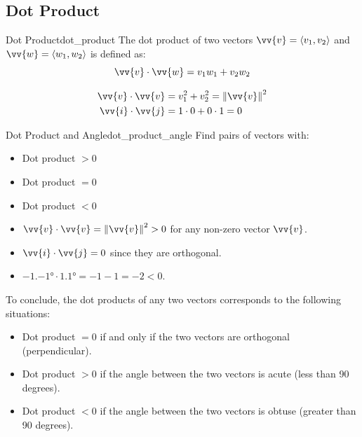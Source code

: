 \subsection{Dot Product}
\begin{definition}{Dot Product}{dot_product}
The dot product of two vectors $\vv{v} = \ang{v_1, v_2}$ and $\vv{w} = \ang{w_1, w_2}$ is defined as:
\[
\vv{v} \cdot \vv{w} = v_1 w_1 + v_2 w_2
\]
\end{definition}

\begin{example}
\begin{align*}
\vv{v} \cdot \vv{v} &= v_1^2 + v_2^2 = \norm{\vv{v}}^2\\
\vv{i} \cdot \vv{j} &= 1 \cdot 0 + 0 \cdot 1 = 0
\end{align*}
\end{example}

\begin{problem}{Dot Product and Angle}{dot_product_angle}
Find pairs of vectors with:
\begin{itemize}
    \item Dot product $> 0$
    \item Dot product $= 0$
    \item Dot product $< 0$
\end{itemize}
\end{problem}

\begin{sol}
\begin{itemize}
    \item $\vv{v} \cdot \vv{v} = \norm{\vv{v}}^2 > 0$ for any non-zero vector $\vv{v}$.
    \item $\vv{i} \cdot \vv{j} = 0$ since they are orthogonal.
    \item $\ang{-1, -1} \cdot \ang{1, 1} = -1 - 1 = -2 < 0$.
\end{itemize}
\end{sol}

To conclude, the dot products of any two vectors corresponds to the following situations:
\begin{itemize}
    \item Dot product $= 0$ if and only if the two vectors are orthogonal (perpendicular).
    \item Dot product $> 0$ if the angle between the two vectors is acute (less than 90 degrees).
    \item Dot product $< 0$ if the angle between the two vectors is obtuse (greater than 90 degrees).
\end{itemize}

